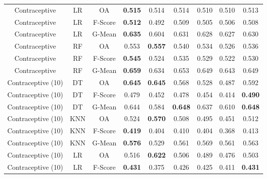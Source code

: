 \begin{longtable}{ccccccccc}
     Contraceptive &         LR &      OA & \textbf{0.515} &          0.514 &          0.514 &          0.510 &          0.510 &          0.513 \\
     Contraceptive &         LR & F-Score & \textbf{0.512} &          0.492 &          0.509 &          0.505 &          0.506 &          0.508 \\
     Contraceptive &         LR &  G-Mean & \textbf{0.635} &          0.604 &          0.631 &          0.628 &          0.627 &          0.630 \\
     Contraceptive &         RF &      OA &          0.553 & \textbf{0.557} &          0.540 &          0.534 &          0.526 &          0.536 \\
     Contraceptive &         RF & F-Score & \textbf{0.545} &          0.524 &          0.535 &          0.529 &          0.522 &          0.530 \\
     Contraceptive &         RF &  G-Mean & \textbf{0.659} &          0.634 &          0.653 &          0.649 &          0.643 &          0.649 \\
Contraceptive (10) &         DT &      OA & \textbf{0.645} & \textbf{0.645} &          0.568 &          0.528 &          0.487 &          0.592 \\
Contraceptive (10) &         DT & F-Score &          0.479 &          0.452 &          0.478 &          0.454 &          0.414 & \textbf{0.490} \\
Contraceptive (10) &         DT &  G-Mean &          0.644 &          0.584 & \textbf{0.648} &          0.637 &          0.610 & \textbf{0.648} \\
Contraceptive (10) &        KNN &      OA &          0.524 & \textbf{0.570} &          0.508 &          0.495 &          0.451 &          0.512 \\
Contraceptive (10) &        KNN & F-Score & \textbf{0.419} &          0.404 &          0.410 &          0.404 &          0.368 &          0.413 \\
Contraceptive (10) &        KNN &  G-Mean & \textbf{0.576} &          0.529 &          0.561 &          0.569 &          0.561 &          0.563 \\
Contraceptive (10) &         LR &      OA &          0.516 & \textbf{0.622} &          0.506 &          0.489 &          0.476 &          0.503 \\
Contraceptive (10) &         LR & F-Score & \textbf{0.431} &          0.375 &          0.426 &          0.425 &          0.411 & \textbf{0.431} \\

\end{longtable}
